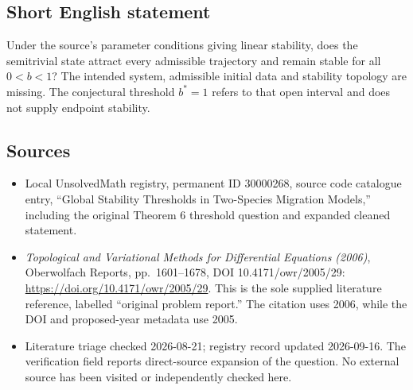 \documentclass[11pt]{article}
\begin{document}
\subsection{Short English statement}
Under the source's parameter conditions giving linear stability, does the semitrivial state attract every admissible trajectory and remain stable for all \(0<b<1\)? The intended system, admissible initial data and stability topology are missing. The conjectural threshold \(b^*=1\) refers to that open interval and does not supply endpoint stability.
\subsection{Sources}
\begin{itemize}
\item Local UnsolvedMath registry, permanent ID 30000268, source code catalogue entry, ``Global Stability Thresholds in Two-Species Migration Models,'' including the original Theorem 6 threshold question and expanded cleaned statement.
\item \emph{Topological and Variational Methods for Differential Equations (2006)}, Oberwolfach Reports, pp.\ 1601--1678, DOI 10.4171/owr/2005/29: \url{https://doi.org/10.4171/owr/2005/29}. This is the sole supplied literature reference, labelled ``original problem report.'' The citation uses 2006, while the DOI and proposed-year metadata use 2005.
\item Literature triage checked 2026-08-21; registry record updated 2026-09-16. The verification field reports direct-source expansion of the question. No external source has been visited or independently checked here.
\end{itemize}
\end{document}
